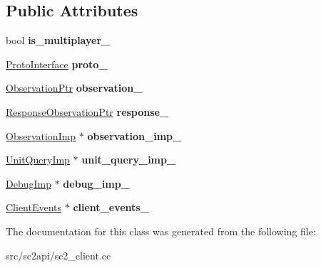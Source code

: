 \subsection*{Public Attributes}
\begin{DoxyCompactItemize}
\item 
\mbox{\label{classsc2_1_1_control_imp_a03efcaf59a37ff4085877f4b11ba073a}} 
bool {\bfseries is\+\_\+multiplayer\+\_\+}
\item 
\mbox{\label{classsc2_1_1_control_imp_a40b44ae68c88702d008285ad9abb3548}} 
\hyperlink{classsc2_1_1_proto_interface}{Proto\+Interface} {\bfseries proto\+\_\+}
\item 
\mbox{\label{classsc2_1_1_control_imp_a9e429d61b91c603b275be96c47ca4ea5}} 
\hyperlink{classsc2_1_1_message_response_ptr}{Observation\+Ptr} {\bfseries observation\+\_\+}
\item 
\mbox{\label{classsc2_1_1_control_imp_a8877be01980cf17cc5652a0f6e2cd5ec}} 
\hyperlink{classsc2_1_1_message_response_ptr}{Response\+Observation\+Ptr} {\bfseries response\+\_\+}
\item 
\mbox{\label{classsc2_1_1_control_imp_aa75b5d96c925e249f04d081814be6faa}} 
\hyperlink{classsc2_1_1_observation_imp}{Observation\+Imp} $\ast$ {\bfseries observation\+\_\+imp\+\_\+}
\item 
\mbox{\label{classsc2_1_1_control_imp_a902f33695efe78b56daf788255001133}} 
\hyperlink{classsc2_1_1_unit_query_imp}{Unit\+Query\+Imp} $\ast$ {\bfseries unit\+\_\+query\+\_\+imp\+\_\+}
\item 
\mbox{\label{classsc2_1_1_control_imp_acdf128d7609c425297d86094d496947f}} 
\hyperlink{classsc2_1_1_debug_imp}{Debug\+Imp} $\ast$ {\bfseries debug\+\_\+imp\+\_\+}
\item 
\mbox{\label{classsc2_1_1_control_imp_a2c2651511b7fb75725b7d8c8c4b037c6}} 
\hyperlink{classsc2_1_1_client_events}{Client\+Events} $\ast$ {\bfseries client\+\_\+events\+\_\+}
\end{DoxyCompactItemize}


The documentation for this class was generated from the following file\+:\begin{DoxyCompactItemize}
\item 
src/sc2api/sc2\+\_\+client.\+cc\end{DoxyCompactItemize}
